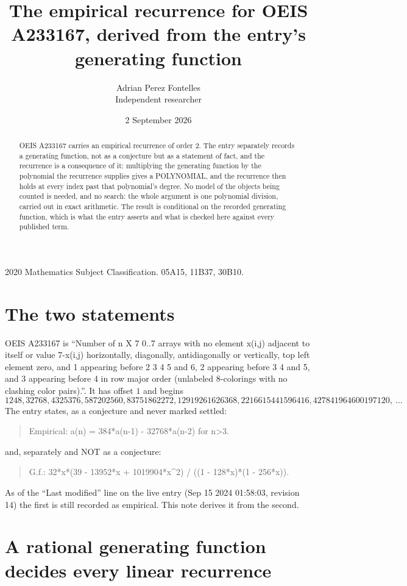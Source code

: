 \documentclass[11pt,a4paper]{article}
\title{The empirical recurrence for OEIS A233167, derived from the entry's generating function}
\author{Adrian Perez Fontelles\\ \small Independent researcher}
\date{2 September 2026}
\theoremstyle{plain}
\theoremstyle{definition}
\begin{document}
\maketitle

\begin{abstract}
OEIS A233167 carries an empirical recurrence of order $2$. The entry separately records a
generating function, not as a conjecture but as a statement of fact, and the recurrence is a
consequence of it: multiplying the generating function by the polynomial the recurrence
supplies gives a POLYNOMIAL, and the recurrence then holds at every index past that
polynomial's degree. No model of the objects being counted is needed, and no search: the
whole argument is one polynomial division, carried out in exact arithmetic. The result is
conditional on the recorded generating function, which is what the entry asserts and what is
checked here against every published term.
\end{abstract}

\noindent\small 2020 Mathematics Subject Classification. 05A15, 11B37, 30B10.\normalsize

\section{The two statements}

OEIS A233167 is ``Number of n X 7 0..7 arrays with no element x(i,j) adjacent to itself or value 7-x(i,j) horizontally, diagonally, antidiagonally or vertically, top left element zero, and 1 appearing before 2 3 4 5 and 6, 2 appearing before 3 4 and 5, and 3 appearing before 4 in row major order (unlabeled 8-colorings with no clashing color pairs).''. It has offset $1$ and begins
\[
1248, 32768, 4325376, 587202560, 83751862272, 12919261626368, 2216615441596416, 427841964600197120,\ \dots
\]
The entry states, as a conjecture and never marked settled:
\begin{quote}
Empirical: a(n) = 384*a(n-1) - 32768*a(n-2) for n>3.
\end{quote}
and, separately and NOT as a conjecture:
\begin{quote}
G.f.: 32*x*(39 - 13952*x + 1019904*x\^{}2) / ((1 - 128*x)*(1 - 256*x)).
\end{quote}
As of the ``Last modified'' line on the live entry (Sep 15 2024 01:58:03, revision 14) the first is still
recorded as empirical. This note derives it from the second.

\section{A rational generating function decides every linear recurrence}
\end{document}
